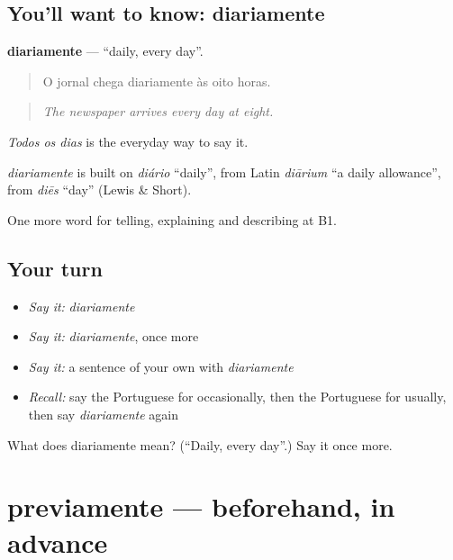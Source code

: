 \subsection*{You'll want to know: diariamente}
\textbf{diariamente} — \textquotedblleft{}daily, every day\textquotedblright{}.

\begin{quote}
O jornal chega diariamente às oito horas.
\end{quote}

\begin{quote}
\emph{The newspaper arrives every day at eight.}
\end{quote}

\emph{Todos os dias} is the everyday way to say it.

\begin{cousinweb}
\emph{diariamente} is built on \emph{diário} \textquotedblleft{}daily\textquotedblright{}, from Latin \emph{diārium} \textquotedblleft{}a daily allowance\textquotedblright{}, from \emph{diēs} \textquotedblleft{}day\textquotedblright{} (Lewis \& Short).
\end{cousinweb}

\begin{grammarlens}[title={What you've built}]
One more word for telling, explaining and describing at B1.
\end{grammarlens}

\subsection*{Your turn}
\begin{itemize}
\raggedright
  \item \emph{Say it:} \emph{diariamente}
  \item \emph{Say it:} \emph{diariamente}, once more
  \item \emph{Say it:} a sentence of your own with \emph{diariamente}
  \item \emph{Recall:} say the Portuguese for occasionally, then the Portuguese for usually, then say \emph{diariamente} again
\end{itemize}

\begin{tcolorbox}[breakable,colback=teal!4,colframe=teal!35!black,title={Before you move on}]
What does diariamente mean? (\textquotedblleft{}Daily, every day\textquotedblright{}.) Say it once more.
\end{tcolorbox}
\section[previamente]{previamente — beforehand, in advance}


